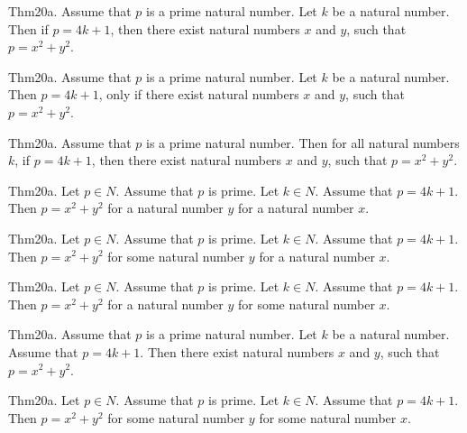\documentclass{article}
\begin{document}
Thm20a. Assume that $p$ is a prime natural number. Let $k$ be a natural number. Then if $p = 4 k + 1$, then there exist natural numbers $x$ and $y$, such that $p = x ^{ 2}+ y ^{ 2}$.

Thm20a. Assume that $p$ is a prime natural number. Let $k$ be a natural number. Then $p = 4 k + 1$, only if there exist natural numbers $x$ and $y$, such that $p = x ^{ 2}+ y ^{ 2}$.

Thm20a. Assume that $p$ is a prime natural number. Then for all natural numbers $k$, if $p = 4 k + 1$, then there exist natural numbers $x$ and $y$, such that $p = x ^{ 2}+ y ^{ 2}$.

Thm20a. Let $p \in N$. Assume that $p$ is prime. Let $k \in N$. Assume that $p = 4 k + 1$. Then $p = x ^{ 2}+ y ^{ 2}$ for a natural number $y$ for a natural number $x$.

Thm20a. Let $p \in N$. Assume that $p$ is prime. Let $k \in N$. Assume that $p = 4 k + 1$. Then $p = x ^{ 2}+ y ^{ 2}$ for some natural number $y$ for a natural number $x$.

Thm20a. Let $p \in N$. Assume that $p$ is prime. Let $k \in N$. Assume that $p = 4 k + 1$. Then $p = x ^{ 2}+ y ^{ 2}$ for a natural number $y$ for some natural number $x$.

Thm20a. Assume that $p$ is a prime natural number. Let $k$ be a natural number. Assume that $p = 4 k + 1$. Then there exist natural numbers $x$ and $y$, such that $p = x ^{ 2}+ y ^{ 2}$.

Thm20a. Let $p \in N$. Assume that $p$ is prime. Let $k \in N$. Assume that $p = 4 k + 1$. Then $p = x ^{ 2}+ y ^{ 2}$ for some natural number $y$ for some natural number $x$.
\end{document}
